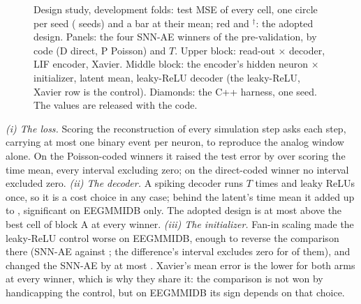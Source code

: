 \documentclass[conference]{IEEEtran}
\begin{document}
\begin{figure}[!t]
  \centering
  
  \caption{Design study, development folds: test MSE of every cell, one circle per seed
  (\designSeeds{} seeds) and a bar at their mean; red and $^\dagger$: the adopted design. Panels:
  the four SNN-AE winners of the pre-validation, by code (D direct, P Poisson) and $T$. Upper
  block: read-out $\times$ decoder, LIF encoder, Xavier. Middle block: the encoder's hidden neuron
  $\times$ initializer, latent mean, leaky-ReLU decoder (the leaky-ReLU, Xavier row is the
  control). Diamonds: the C++ harness, one seed. The values are released with the code.}
  \label{fig:design}
\end{figure}

\par \emph{(i) The loss.} Scoring the reconstruction of every simulation step asks each step,
carrying at most one binary event per neuron, to reproduce the analog window alone. On the
Poisson-coded winners it raised the test error by \designLossStep{} over scoring the time mean,
every interval excluding zero; on the direct-coded winner no interval excluded zero.
\emph{(ii) The decoder.} A spiking decoder runs $T$ times and leaky ReLUs once, so it is a cost
choice in any case; behind the latent's time mean it added up to \designDecoderMax{}, significant
on EEGMMIDB only. The adopted design is at most \designAdoptedGap{} above the best cell of block A
at every winner. \emph{(iii) The initializer.} Fan-in scaling made the leaky-ReLU control
\designKaimingCtrl{} worse on EEGMMIDB, enough to reverse the comparison there (SNN-AE
\designKaimingSnnEeg{} against \designKaimingCtrlEeg{}; the difference's interval excludes zero
for \designKaimingReverseSig{} of them), and changed the SNN-AE by at most \designKaimingSnnMax{}.
Xavier's mean error is the lower for both arms at every winner, which is why they share it: the
comparison is not won by handicapping the control, but on EEGMMIDB its sign depends on that choice.
\end{document}
